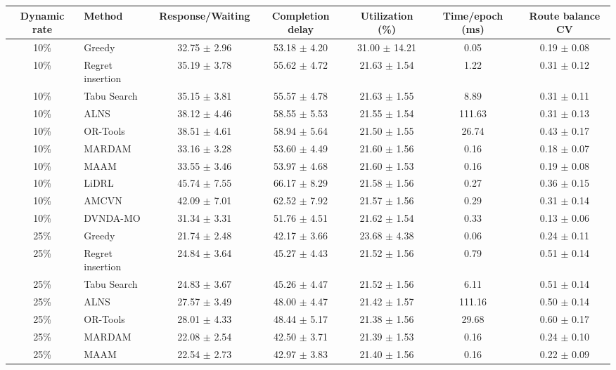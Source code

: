\begin{tabular}{clccccc}
\toprule
Dynamic rate & Method & Response/Waiting & Completion delay & Utilization (\%) & Time/epoch (ms) & Route balance CV \\
\midrule
10\% & Greedy & 32.75 $\pm$ 2.96 & 53.18 $\pm$ 4.20 & 31.00 $\pm$ 14.21 & 0.05 & 0.19 $\pm$ 0.08 \\
10\% & Regret insertion & 35.19 $\pm$ 3.78 & 55.62 $\pm$ 4.72 & 21.63 $\pm$ 1.54 & 1.22 & 0.31 $\pm$ 0.12 \\
10\% & Tabu Search & 35.15 $\pm$ 3.81 & 55.57 $\pm$ 4.78 & 21.63 $\pm$ 1.55 & 8.89 & 0.31 $\pm$ 0.11 \\
10\% & ALNS & 38.12 $\pm$ 4.46 & 58.55 $\pm$ 5.53 & 21.55 $\pm$ 1.54 & 111.63 & 0.31 $\pm$ 0.13 \\
10\% & OR-Tools & 38.51 $\pm$ 4.61 & 58.94 $\pm$ 5.64 & 21.50 $\pm$ 1.55 & 26.74 & 0.43 $\pm$ 0.17 \\
10\% & MARDAM & 33.16 $\pm$ 3.28 & 53.60 $\pm$ 4.49 & 21.60 $\pm$ 1.56 & 0.16 & 0.18 $\pm$ 0.07 \\
10\% & MAAM & 33.55 $\pm$ 3.46 & 53.97 $\pm$ 4.68 & 21.60 $\pm$ 1.53 & 0.16 & 0.19 $\pm$ 0.08 \\
10\% & LiDRL & 45.74 $\pm$ 7.55 & 66.17 $\pm$ 8.29 & 21.58 $\pm$ 1.56 & 0.27 & 0.36 $\pm$ 0.15 \\
10\% & AMCVN & 42.09 $\pm$ 7.01 & 62.52 $\pm$ 7.92 & 21.57 $\pm$ 1.56 & 0.29 & 0.31 $\pm$ 0.14 \\
10\% & DVNDA-MO & 31.34 $\pm$ 3.31 & 51.76 $\pm$ 4.51 & 21.62 $\pm$ 1.54 & 0.33 & 0.13 $\pm$ 0.06 \\
25\% & Greedy & 21.74 $\pm$ 2.48 & 42.17 $\pm$ 3.66 & 23.68 $\pm$ 4.38 & 0.06 & 0.24 $\pm$ 0.11 \\
25\% & Regret insertion & 24.84 $\pm$ 3.64 & 45.27 $\pm$ 4.43 & 21.52 $\pm$ 1.56 & 0.79 & 0.51 $\pm$ 0.14 \\
25\% & Tabu Search & 24.83 $\pm$ 3.67 & 45.26 $\pm$ 4.47 & 21.52 $\pm$ 1.56 & 6.11 & 0.51 $\pm$ 0.14 \\
25\% & ALNS & 27.57 $\pm$ 3.49 & 48.00 $\pm$ 4.47 & 21.42 $\pm$ 1.57 & 111.16 & 0.50 $\pm$ 0.14 \\
25\% & OR-Tools & 28.01 $\pm$ 4.33 & 48.44 $\pm$ 5.17 & 21.38 $\pm$ 1.56 & 29.68 & 0.60 $\pm$ 0.17 \\
25\% & MARDAM & 22.08 $\pm$ 2.54 & 42.50 $\pm$ 3.71 & 21.39 $\pm$ 1.53 & 0.16 & 0.24 $\pm$ 0.10 \\
25\% & MAAM & 22.54 $\pm$ 2.73 & 42.97 $\pm$ 3.83 & 21.40 $\pm$ 1.56 & 0.16 & 0.22 $\pm$ 0.09 \\

\end{tabular}
